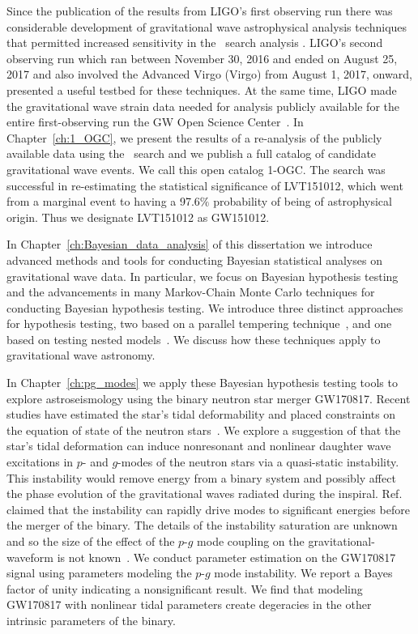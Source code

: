 Since the publication of the results from LIGO's first observing run there was considerable development of gravitational wave astrophysical analysis techniques that permitted increased sensitivity in the \pycbc{}\ search analysis \citep{Nitz:2017svb,Nitz:2017lco,DalCanton:2017ala}. LIGO's second observing run which ran between November 30, 2016 and ended on August 25, 2017 and also involved the Advanced Virgo (Virgo) from August 1, 2017, onward, presented a useful testbed for these techniques. At the same time, LIGO made the gravitational wave strain data needed for analysis publicly available for the entire first-observing run the GW Open Science Center~\citep{Vallisneri:2014vxa}. In Chapter~\ref{ch:1_OGC}, we present the results of a re-analysis of the publicly available data using the \pycbc{}\ search and we publish a full catalog of candidate gravitational wave events. We call this open catalog 1-OGC. The search was successful in re-estimating the statistical significance of LVT151012, which went from a marginal event to having a 97.6$\%$ probability of being of astrophysical origin. Thus we designate LVT151012 as GW151012. 


In Chapter~\ref{ch:Bayesian_data_analysis} of this dissertation we introduce advanced methods and tools for conducting Bayesian statistical analyses on gravitational wave data. In particular, we focus on Bayesian hypothesis testing and the advancements in many Markov-Chain Monte Carlo techniques for conducting Bayesian hypothesis testing. We introduce three distinct approaches for hypothesis testing, two based on a parallel tempering technique~\cite{lartillot2006computing,friel2008marginal,xie2010improving}, and one based on testing nested models~\cite{edwards1963bayesian, dickey1971weighted}. We discuss how these techniques apply to gravitational wave astronomy. 

In Chapter~\ref{ch:pg_modes} we apply these Bayesian hypothesis testing tools to explore astroseismology using the binary neutron star merger GW170817. Recent studies have estimated the star's tidal deformability and placed constraints on the equation of state of the neutron stars~\citep{TheLIGOScientific:2017qsa,Tews:2018iwm,Most:2018eaw,Raithel:2018ncd,de2018tidal,Abbott:2018exr,Abbott:2018wiz,Radice:2018ozg,LIGOScientific:2019eut,Capano:2019eae}. We explore a suggestion of \cite{Weinberg:2013pbi} that the star's tidal deformation can induce nonresonant and nonlinear daughter wave excitations in $p$- and $g$-modes of the neutron stars via a quasi-static instability. This instability would remove energy from a binary system and possibly affect the phase evolution of the gravitational waves radiated during the inspiral. Ref. \cite{Weinberg:2015pxa} claimed that the instability can rapidly drive modes to significant energies before the merger of the binary. The details of the instability saturation are unknown and so the size of the effect of the $p$-$g$ mode coupling on the gravitational-waveform is not known~\citep{Weinberg:2015pxa}. We conduct parameter estimation on the GW170817 signal using parameters modeling the $p$-$g$ mode instability. We report a Bayes factor of unity indicating a nonsignificant result. We find that modeling GW170817 with nonlinear tidal parameters create degeracies in the other intrinsic parameters of the binary. 
